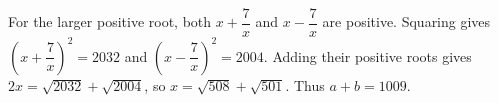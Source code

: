 For the larger positive root, both $x+\dfrac{7}{x}$ and $x-\dfrac{7}{x}$ are positive. Squaring gives $(x+\dfrac{7}{x})^2=2032$ and $(x-\dfrac{7}{x})^2=2004$. Adding their positive roots gives $2x=\sqrt{2032}+\sqrt{2004}$, so $x=\sqrt{508}+\sqrt{501}$. Thus $\boxed{a+b=1009}$.
